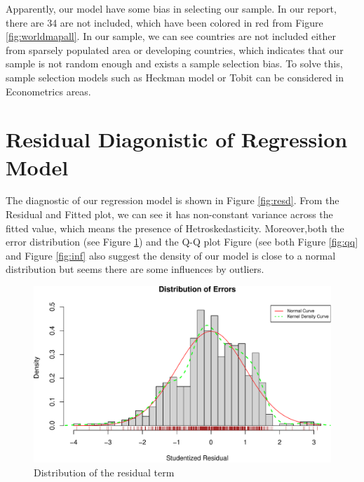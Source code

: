 \documentclass[11pt,a4paper,]{article}
\begin{document}
Apparently, our model have some bias in selecting our sample. In our report, there are 34 are not included, which have been colored in red from Figure \ref{fig:worldmapall}. In our sample, we can see countries are not included either from sparsely populated area or developing countries, which indicates that our sample is not random enough and exists a sample selection bias. To solve this, sample selection models such as Heckman model or Tobit can be considered in Econometrics areas.

\newpage

\hypertarget{residual-diagonistic-of-regression-model}{%
\section{Residual Diagonistic of Regression Model}\label{residual-diagonistic-of-regression-model}}

The diagnostic of our regression model is shown in Figure \ref{fig:resd}. From the Residual and Fitted plot, we can see it has non-constant variance across the fitted value, which means the presence of Hetroskedasticity. Moreover,both the error distribution (see Figure \ref{fig:density}) and the Q-Q plot Figure (see both Figure \ref{fig:qq} and Figure \ref{fig:inf} also suggest the density of our model is close to a normal distribution but seems there are some influences by outliers.

\begin{figure}
\centering
\includegraphics{Assignment4_files/figure-latex/density-1.pdf}
\caption{\label{fig:density}Distribution of the residual term}
\end{figure}
\end{document}
